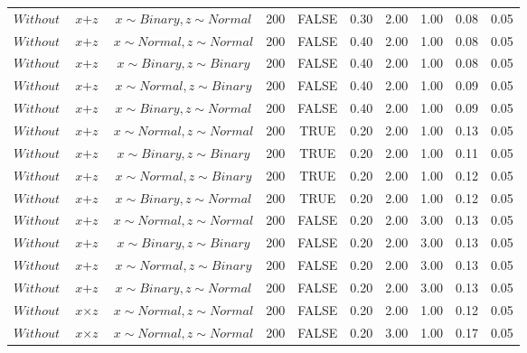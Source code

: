 \begin{longtable}{lccccccccc}
  $Without$ & $\textit{x} + \textit{z}$ & $\textit{x} \sim Binary, \textit{z} \sim Normal$ & 200 & FALSE & 0.30 & 2.00 & 1.00 & 0.08 & 0.05 \\ 
  $Without$ & $\textit{x} + \textit{z}$ & $\textit{x} \sim Normal , \textit{z} \sim Normal$ & 200 & FALSE & 0.40 & 2.00 & 1.00 & 0.08 & 0.05 \\ 
  $Without$ & $\textit{x} + \textit{z}$ & $\textit{x} \sim Binary, \textit{z} \sim Binary$ & 200 & FALSE & 0.40 & 2.00 & 1.00 & 0.08 & 0.05 \\ 
  $Without$ & $\textit{x} + \textit{z}$ & $\textit{x} \sim Normal, \textit{z} \sim Binary$ & 200 & FALSE & 0.40 & 2.00 & 1.00 & 0.09 & 0.05 \\ 
  $Without$ & $\textit{x} + \textit{z}$ & $\textit{x} \sim Binary, \textit{z} \sim Normal$ & 200 & FALSE & 0.40 & 2.00 & 1.00 & 0.09 & 0.05 \\ 
  $Without$ & $\textit{x} + \textit{z}$ & $\textit{x} \sim Normal , \textit{z} \sim Normal$ & 200 & TRUE & 0.20 & 2.00 & 1.00 & 0.13 & 0.05 \\ 
  $Without$ & $\textit{x} + \textit{z}$ & $\textit{x} \sim Binary, \textit{z} \sim Binary$ & 200 & TRUE & 0.20 & 2.00 & 1.00 & 0.11 & 0.05 \\ 
  $Without$ & $\textit{x} + \textit{z}$ & $\textit{x} \sim Normal, \textit{z} \sim Binary$ & 200 & TRUE & 0.20 & 2.00 & 1.00 & 0.12 & 0.05 \\ 
  $Without$ & $\textit{x} + \textit{z}$ & $\textit{x} \sim Binary, \textit{z} \sim Normal$ & 200 & TRUE & 0.20 & 2.00 & 1.00 & 0.12 & 0.05 \\ 
  $Without$ & $\textit{x} + \textit{z}$ & $\textit{x} \sim Normal , \textit{z} \sim Normal$ & 200 & FALSE & 0.20 & 2.00 & 3.00 & 0.13 & 0.05 \\ 
  $Without$ & $\textit{x} + \textit{z}$ & $\textit{x} \sim Binary, \textit{z} \sim Binary$ & 200 & FALSE & 0.20 & 2.00 & 3.00 & 0.13 & 0.05 \\ 
  $Without$ & $\textit{x} + \textit{z}$ & $\textit{x} \sim Normal, \textit{z} \sim Binary$ & 200 & FALSE & 0.20 & 2.00 & 3.00 & 0.13 & 0.05 \\ 
  $Without$ & $\textit{x} + \textit{z}$ & $\textit{x} \sim Binary, \textit{z} \sim Normal$ & 200 & FALSE & 0.20 & 2.00 & 3.00 & 0.13 & 0.05 \\ 
  $Without$ & $\textit{x} \times \textit{z}$ & $\textit{x} \sim Normal , \textit{z} \sim Normal$ & 200 & FALSE & 0.20 & 2.00 & 1.00 & 0.12 & 0.05 \\ 
  $Without$ & $\textit{x} \times \textit{z}$ & $\textit{x} \sim Normal , \textit{z} \sim Normal$ & 200 & FALSE & 0.20 & 3.00 & 1.00 & 0.17 & 0.05 \\ 

\end{longtable}

